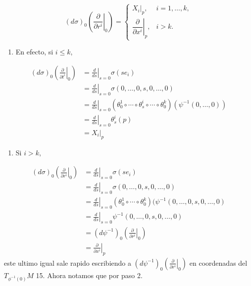 \begin{bookproof}{}
\[
(d\sigma)_0\left(\left.\frac{\partial}{\partial r^i}\right|_0\right)=\begin{cases} X_i|_p, & i=1,\ldots,k,\\[4pt] \left.\dfrac{\partial}{\partial x^i}\right|_p, & i>k.\end{cases}
\]
\begin{enumerate}[start=13]
\item En efecto, si $i\leq k$,
\end{enumerate}
\[
\begin{aligned}(d\sigma)_0\left(\left.\frac{\partial}{\partial t^i}\right|_0\right)&=\left.\frac{d}{ds}\right|_{s=0}\sigma(se_i)\\&=\left.\frac{d}{ds}\right|_{s=0}\sigma(0,\ldots,0,s,0,\ldots,0)\\&=\left.\frac{d}{ds}\right|_{s=0}\left(\theta^{1}_{0}\circ\cdots\circ\theta^{i}_{s}\circ\cdots\circ\theta^{k}_{0}\right)\left(\psi^{-1}(0,\ldots,0)\right)\\&=\left.\frac{d}{ds}\right|_{s=0}\theta^{i}_{s}(p)\\&=X_i|_p\end{aligned}
\]
\begin{enumerate}[start=14]
\item Si $i>k$,
\end{enumerate}
\[
\begin{aligned}(d\sigma)_0\left(\left.\frac{\partial}{\partial r^i}\right|_0\right)&=\left.\frac{d}{ds}\right|_{s=0}\sigma(se_i)\\&=\left.\frac{d}{ds}\right|_{s=0}\sigma(0,\ldots,0,s,0,\ldots,0)\\&=\left.\frac{d}{ds}\right|_{s=0}(\theta^{1}_{0}\circ\cdots\circ\theta^{k}_{0})(\psi^{-1}(0,\ldots,0,s,0,\ldots,0)\\&=\left.\frac{d}{ds}\right|_{s=0}\psi^{-1}(0,\ldots,0,s,0,\ldots,0)\\&=(d\psi^{-1})_0\left(\left.\frac{\partial}{\partial r^i}\right|_0\right)\\&=\left.\frac{\partial}{\partial x^i}\right|_p\end{aligned}
\]
este ultimo igual sale rapido escribiendo a $(d\psi^{-1})_0\left(\left.\frac{\partial}{\partial r^i}\right|_0\right)$ en coordenadas del $T_{\phi ^{-1}(0)}M$ 15. Ahora notamos que por paso 2.


\end{bookproof}
